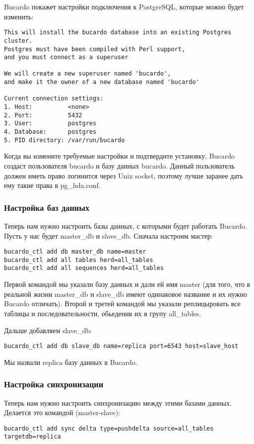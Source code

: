 Bucardo покажет настройки подключения к PostgreSQL, которые можно будет изменить:
\begin{verbatim}
This will install the bucardo database into an existing Postgres cluster.
Postgres must have been compiled with Perl support,
and you must connect as a superuser

We will create a new superuser named 'bucardo',
and make it the owner of a new database named 'bucardo'

Current connection settings:
1. Host:          <none>
2. Port:          5432
3. User:          postgres
4. Database:      postgres
5. PID directory: /var/run/bucardo
\end{verbatim}

Когда вы измените требуемые настройки и подтвердите установку, Bucardo создаст пользователя bucardo и базу данных bucardo.
Данный пользователь должен иметь право логинится через Unix socket, поэтому лучше заранее дать ему такие права в pg\_hda.conf.

\subsubsection{Настройка баз данных}
Теперь нам нужно настроить базы данных, с которыми будет работать Bucardo. 
Пусть у нас будет master\_db и slave\_db. Сначала настроим мастер:
\begin{verbatim}
bucardo_ctl add db master_db name=master
bucardo_ctl add all tables herd=all_tables
bucardo_ctl add all sequences herd=all_tables
\end{verbatim}

Первой командой мы указали базу данных и дали ей имя master (для того, что в реальной жизни master\_db и slave\_db 
имеют одинаковое название и их нужно Bucardo отличать). Второй и третей командой мы указали реплицыровать все 
таблицы и последовательности, обьеденив их в групу all\_tables.

Дальше добавляем slave\_db:
\begin{verbatim}
bucardo_ctl add db slave_db name=replica port=6543 host=slave_host
\end{verbatim}

Мы назвали replica базу данных в Bucardo.

\subsubsection{Настройка синхронизации}
Теперь нам нужно настроить синхронизацию между этими базами данных. Делается это командой (master-slave):
\begin{verbatim}
bucardo_ctl add sync delta type=pushdelta source=all_tables targetdb=replica
\end{verbatim}

